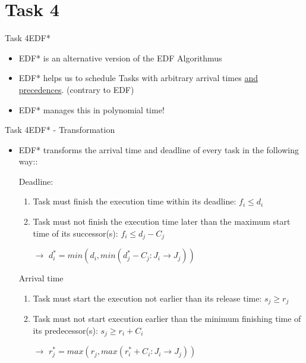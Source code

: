 
\section{Task 4}

\setcounter{task}{1}

\begin{frame}{Task 4}{EDF*}
\begin{itemize}
    \item EDF* is an alternative version of the EDF Algorithmus
    \item EDF* helps us to schedule Tasks with arbitrary arrival times \alert{\underline{and precedences}}. (contrary to EDF)
    \item EDF* manages this in polynomial time!
\end{itemize}
\end{frame}

\begin{frame}[allowframebreaks]{Task 4}{EDF* - Transformation}
\begin{itemize}
    \item EDF* transforms the arrival time and deadline of every task in the following way::
    \item[] \alert{Deadline}: \begin{enumerate}
        \item Task must finish the execution time within its deadline: $f_i \leq d_i$
        \item Task must not finish the execution time later than the maximum start time of its successor(s): $f_i \leq d_j - C_j$
        \item[$\rightarrow$] $d_i^* = min(d_i, min(d_j^* - C_j : J_i \rightarrow J_j))$
    \end{enumerate}
    \framebreak
    \item[] \alert{Arrival time} \begin{enumerate}
        \item Task must start the execution not earlier than its release time: $s_j \geq r_j$
        \item Task must not start execution earlier than the minimum finishing time of its predecessor(s): $s_j \geq r_i + C_i$
        \item[$\rightarrow$] $r_j^* = max(r_j, max(r_i^* + C_i : J_i \rightarrow J_j))$
    \end{enumerate}
\end{itemize}
\end{frame}

